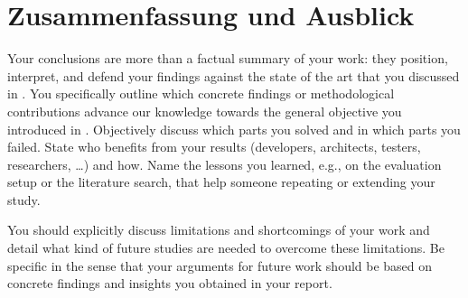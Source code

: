 \documentclass[../main-german]{subfiles}
\begin{document}
\chapter{Zusammenfassung und Ausblick}\label{sec:conclusion}

Your conclusions are more than a factual summary of your work: they position, interpret, and defend your findings against the state of the art that you discussed in .
You specifically outline which concrete findings or methodological contributions advance our knowledge towards the general objective you introduced in .
Objectively discuss which parts you solved and in which parts you failed.
State who benefits from your results (developers, architects, testers, researchers, \ldots) and how.
Name the lessons you learned, e.g., on the evaluation setup or the literature search, that help someone repeating or extending your study.

You should explicitly discuss limitations and shortcomings of your work and detail what kind of future studies are needed to overcome these limitations.
Be specific in the sense that your arguments for future work should be based on concrete findings and insights you obtained in your report.
\end{document}
